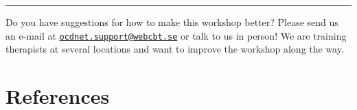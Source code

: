 \documentclass[]{book}
\begin{document}
\begin{center}\rule{0.5\linewidth}{\linethickness}\end{center}

Do you have suggestions for how to make this workshop better? Please send us an e-mail at \href{mailto:ocdnet.support@webcbt.se}{\nolinkurl{ocdnet.support@webcbt.se}} or talk to us in person! We are training therapists at several locations and want to improve the workshop along the way.

\hypertarget{references}{%
\chapter{References}\label{references}}


\end{document}
